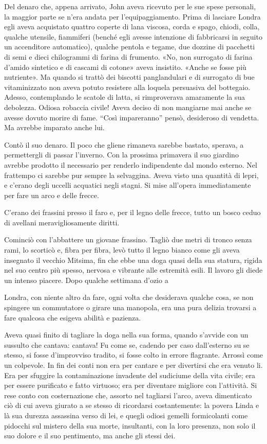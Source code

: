 \documentclass[
a5paper, %
10pt, %
twoside, 
onecolumn, %
openany, %
]{memoir}
\begin{document}
Del denaro che, appena arrivato, John aveva ricevuto per le sue spese personali, la maggior parte se n’era andata per l’equipaggiamento. Prima di lasciare Londra egli aveva acquistato quattro coperte di lana viscosa, corda e spago, chiodi, colla, qualche utensile, fiammiferi (benché egli avesse intenzione di fabbricarsi in seguito un accenditore automatico), qualche pentola e tegame, due dozzine di pacchetti di semi e dieci chilogrammi di farina di frumento. «No, non surrogato di farina d’amido sintetico e di cascami di cotone» aveva insistito. «Anche se fosse più nutriente». Ma quando si trattò dei biscotti panglandulari e di surrogato di bue vitaminizzato non aveva potuto resistere alla loquela persuasiva del bottegaio. Adesso, contemplando le scatole di latta, si rimproverava amaramente la sua debolezza. Odiosa robaccia civile! Aveva deciso di non mangiarne mai anche se avesse dovuto morire di fame. “Così impareranno” pensò, desideroso di vendetta. Ma avrebbe imparato anche lui.

Contò il suo denaro. Il poco che gliene rimaneva sarebbe bastato, sperava, a permettergli di passar l’inverno. Con la prossima primavera il suo giardino avrebbe prodotto il necessario per renderlo indipendente dal mondo esterno. Nel frattempo ci sarebbe pur sempre la selvaggina. Aveva visto una quantità di lepri, e c’erano degli uccelli acquatici negli stagni. Si mise all’opera immediatamente per fare un arco e delle frecce.

C’erano dei frassini presso il faro e, per il legno delle frecce, tutto un bosco ceduo di avellani meravigliosamente diritti.

Cominciò con l’abbattere un giovane frassino. Tagliò due metri di tronco senza rami, lo scorticò e, fibra per fibra, levò tutto il legno bianco come gli aveva insegnato il vecchio Mitsima, fin che ebbe una doga quasi della sua statura, rigida nel suo centro più spesso, nervosa e vibrante alle estremità esili. Il lavoro gli diede un intenso piacere. Dopo qualche settimana d’ozio a

Londra, con niente altro da fare, ogni volta che desiderava qualche cosa, se non spingere un commutatore o girare una manopola, era una pura delizia trovarsi a fare qualcosa che esigeva abilità e pazienza.

Aveva quasi finito di tagliare la doga nella sua forma, quando s’avvide con un sussulto che cantava: cantava! Fu come se, cadendo per caso dall’esterno su se stesso, si fosse d’improvviso tradito, si fosse colto in errore flagrante. Arrossì come un colpevole. In fin dei conti non era per cantare e per divertirsi che era venuto li. Era per sfuggire la contaminazione invadente del sudiciume della vita civile; era per essere purificato e fatto virtuoso; era per diventare migliore con l’attività. Si rese conto con costernazione che, assorto nel tagliarsi l’arco, aveva dimenticato ciò di cui aveva giurato a se stesso di ricordarsi costantemente: la povera Linda e là sua durezza assassina verso di lei, e quegli odiosi gemelli formicolanti come pidocchi sul mistero della sua morte, insultanti, con la loro presenza, non solo il suo dolore e il suo pentimento, ma anche gli stessi dei.
\end{document}
